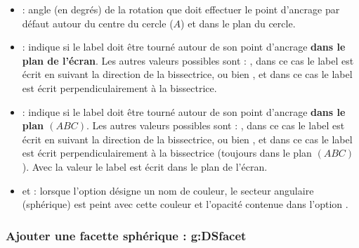 \begin{itemize}
\begin{itemize}
            \item {} : angle (en degrés) de la rotation que doit effectuer le point d'ancrage par défaut autour du centre du cercle ($A$) et dans le plan du cercle.
            
            \item {} : indique si le label doit être tourné autour de son point d'ancrage \textbf{dans le plan de l'écran}. Les autres valeurs possibles sont : , dans ce cas le label est écrit en suivant la direction de la bissectrice, ou bien , et dans ce cas le label est écrit perpendiculairement à la bissectrice.
            
            \item {} : indique si le label doit être tourné autour de son point d'ancrage \textbf{dans le plan $(ABC)$}. Les autres valeurs possibles sont : , dans ce cas le label est écrit en suivant la direction de la bissectrice, ou bien , et dans ce cas le label est écrit perpendiculairement à la bissectrice (toujours dans le plan $(ABC)$). Avec la valeur  le label est écrit dans le plan de l'écran.
            
            \item {} et  : lorsque l'option  désigne un nom de couleur, le secteur angulaire (sphérique) est peint avec cette couleur et l'opacité contenue dans l'option .
        \end{itemize}        
    \end{itemize}
    
\subsubsection{Ajouter une facette sphérique : g:DSfacet}

